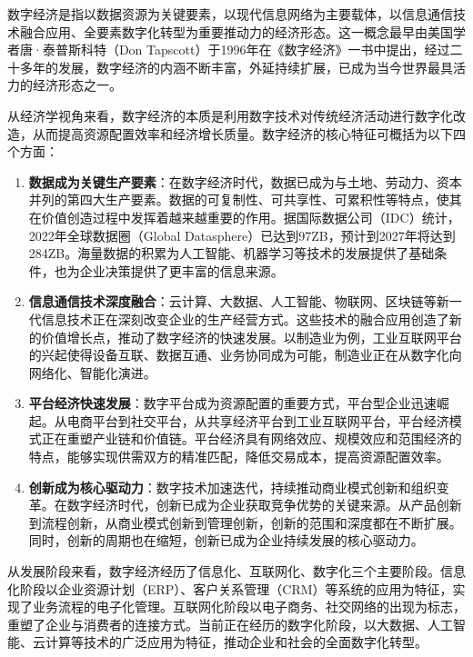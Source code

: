 \documentclass[12pt,a4paper]{article}
\begin{document}
数字经济是指以数据资源为关键要素，以现代信息网络为主要载体，以信息通信技术融合应用、全要素数字化转型为重要推动力的经济形态。这一概念最早由美国学者唐·泰普斯科特（Don Tapscott）于1996年在《数字经济》一书中提出，经过二十多年的发展，数字经济的内涵不断丰富，外延持续扩展，已成为当今世界最具活力的经济形态之一。

从经济学视角来看，数字经济的本质是利用数字技术对传统经济活动进行数字化改造，从而提高资源配置效率和经济增长质量。数字经济的核心特征可概括为以下四个方面：

\begin{enumerate}
\item \textbf{数据成为关键生产要素}：在数字经济时代，数据已成为与土地、劳动力、资本并列的第四大生产要素。数据的可复制性、可共享性、可累积性等特点，使其在价值创造过程中发挥着越来越重要的作用。据国际数据公司（IDC）统计，2022年全球数据圈（Global Datasphere）已达到97ZB，预计到2027年将达到284ZB。海量数据的积累为人工智能、机器学习等技术的发展提供了基础条件，也为企业决策提供了更丰富的信息来源。

\item \textbf{信息通信技术深度融合}：云计算、大数据、人工智能、物联网、区块链等新一代信息技术正在深刻改变企业的生产经营方式。这些技术的融合应用创造了新的价值增长点，推动了数字经济的快速发展。以制造业为例，工业互联网平台的兴起使得设备互联、数据互通、业务协同成为可能，制造业正在从数字化向网络化、智能化演进。

\item \textbf{平台经济快速发展}：数字平台成为资源配置的重要方式，平台型企业迅速崛起。从电商平台到社交平台，从共享经济平台到工业互联网平台，平台经济模式正在重塑产业链和价值链。平台经济具有网络效应、规模效应和范围经济的特点，能够实现供需双方的精准匹配，降低交易成本，提高资源配置效率。

\item \textbf{创新成为核心驱动力}：数字技术加速迭代，持续推动商业模式创新和组织变革。在数字经济时代，创新已成为企业获取竞争优势的关键来源。从产品创新到流程创新，从商业模式创新到管理创新，创新的范围和深度都在不断扩展。同时，创新的周期也在缩短，创新已成为企业持续发展的核心驱动力。
\end{enumerate}

从发展阶段来看，数字经济经历了信息化、互联网化、数字化三个主要阶段。信息化阶段以企业资源计划（ERP）、客户关系管理（CRM）等系统的应用为特征，实现了业务流程的电子化管理。互联网化阶段以电子商务、社交网络的出现为标志，重塑了企业与消费者的连接方式。当前正在经历的数字化阶段，以大数据、人工智能、云计算等技术的广泛应用为特征，推动企业和社会的全面数字化转型。
\end{document}
